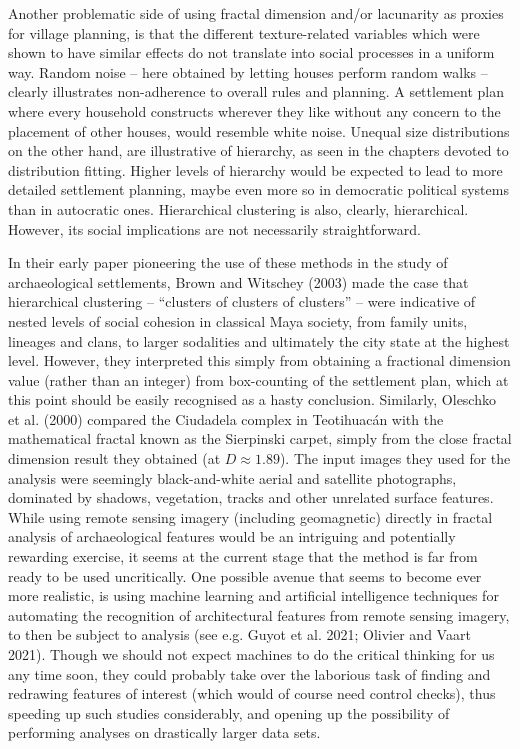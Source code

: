 \documentclass[
  12pt,
  a4paper, twoside]{book}
\begin{document}
Another problematic side of using fractal dimension and/or lacunarity as proxies for village planning, is that the different texture-related variables which were shown to have similar effects do not translate into social processes in a uniform way. Random noise -- here obtained by letting houses perform random walks -- clearly illustrates non-adherence to overall rules and planning. A settlement plan where every household constructs wherever they like without any concern to the placement of other houses, would resemble white noise. Unequal size distributions on the other hand, are illustrative of hierarchy, as seen in the chapters devoted to distribution fitting. Higher levels of hierarchy would be expected to lead to more detailed settlement planning, maybe even more so in democratic political systems than in autocratic ones. Hierarchical clustering is also, clearly, hierarchical. However, its social implications are not necessarily straightforward.

In their early paper pioneering the use of these methods in the study of archaeological settlements, Brown and Witschey (2003) made the case that hierarchical clustering -- ``clusters of clusters of clusters'' -- were indicative of nested levels of social cohesion in classical Maya society, from family units, lineages and clans, to larger sodalities and ultimately the city state at the highest level. However, they interpreted this simply from obtaining a fractional dimension value (rather than an integer) from box-counting of the settlement plan, which at this point should be easily recognised as a hasty conclusion. Similarly, Oleschko et al. (2000) compared the Ciudadela complex in Teotihuacán with the mathematical fractal known as the Sierpinski carpet, simply from the close fractal dimension result they obtained (at \(D \approx 1.89\)). The input images they used for the analysis were seemingly black-and-white aerial and satellite photographs, dominated by shadows, vegetation, tracks and other unrelated surface features. While using remote sensing imagery (including geomagnetic) directly in fractal analysis of archaeological features would be an intriguing and potentially rewarding exercise, it seems at the current stage that the method is far from ready to be used uncritically. One possible avenue that seems to become ever more realistic, is using machine learning and artificial intelligence techniques for automating the recognition of architectural features from remote sensing imagery, to then be subject to analysis (see e.g. Guyot et al. 2021; Olivier and Vaart 2021). Though we should not expect machines to do the critical thinking for us any time soon, they could probably take over the laborious task of finding and redrawing features of interest (which would of course need control checks), thus speeding up such studies considerably, and opening up the possibility of performing analyses on drastically larger data sets.
\end{document}
